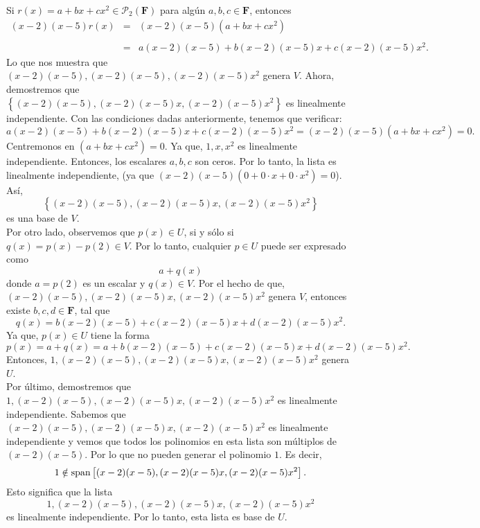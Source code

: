 \begin{enumerate}[\bfseries 1.]
\begin{enumerate}[(a)]
		Si $r(x)=a+bx+cx^2\in \mathcal{P}_2(\textbf{F})$ para algún $a,b,c\in \textbf{F}$, entonces
		$$
		\begin{array}{rcl}
		    (x-2)(x-5)r(x)&=&(x-2)(x-5)\left(a+bx+cx^2\right)\\\\
				  &=& a(x-2)(x-5)+b(x-2)(x-5)x+c(x-2)(x-5)x^2.
		\end{array}
		$$
		Lo que nos muestra que $(x-2)(x-5),(x-2)(x-5),(x-2)(x-5)x^2$ genera $V$. Ahora, demostremos que $\left\{(x-2)(x-5),(x-2)(x-5)x,(x-2)(x-5)x^2\right\}$ es linealmente independiente. Con las condiciones dadas anteriormente, tenemos que verificar:
		$$a(x-2)(x-5)+b(x-2)(x-5)x+c(x-2)(x-5)x^2=(x-2)(x-5)\left(a+bx+cx^2\right)=0.$$
		Centremonos en $(a+bx+cx^2)=0$. Ya que, $1,x,x^2$ es linealmente independiente. Entonces, los escalares $a,b,c$ son ceros. Por lo tanto, la lista es linealmente independiente, (ya que $(x-2)(x-5)\left(0+0\cdot x+0\cdot x^2\right)=0$). Así,
		$$\left\{(x-2)(x-5),(x-2)(x-5)x,(x-2)(x-5)x^2\right\}$$
		es una base de $V$.\\

		Por otro lado, observemos que $p(x)\in U$, si y sólo si $q(x)=p(x)-p(2)\in V$. Por lo tanto, cualquier $p\in U$ puede ser expresado como 
		$$a+q(x)$$
		donde $a=p(2)$ es un escalar y $q(x)\in V$. Por el hecho de que, $(x-2)(x-5),(x-2)(x-5)x,(x-2)(x-5)x^2$ genera $V$, entonces existe $b,c,d\in \textbf{F}$, tal que 
		$$q(x)=b(x-2)(x-5)+c(x-2)(x-5)x+d(x-2)(x-5)x^2.$$
		Ya que, $p(x)\in U$ tiene la forma 
		$$p(x)=a+q(x)=a+b(x-2)(x-5)+c(x-2)(x-5)x+d(x-2)(x-5)x^2.$$
		Entonces, $1,(x-2)(x-5),(x-2)(x-5)x,(x-2)(x-5)x^2$ genera $U$.\\

		Por último, demostremos que $1,(x-2)(x-5),(x-2)(x-5)x,(x-2)(x-5)x^2$ es linealmente independiente. Sabemos que $(x-2)(x-5),(x-2)(x-5)x,(x-2)(x-5)x^2$ es linealmente independiente y vemos que todos los polinomios en esta lista son múltiplos de $(x-2)(x-5)$. Por lo que no pueden generar el polinomio $1$. Es decir, 
		$$1\notin \mathop{\mbox{\normalfont span}}\nolimits\left[(x-2)(x-5),(x-2)(x-5)x,(x-2)(x-5)x^2\right].$$
		Esto significa que la lista
		$$1,(x-2)(x-5),(x-2)(x-5)x,(x-2)(x-5)x^2$$
		es linealmente independiente. Por lo tanto, esta lista es base de $U$.\\\\



\end{enumerate}
\end{enumerate}
